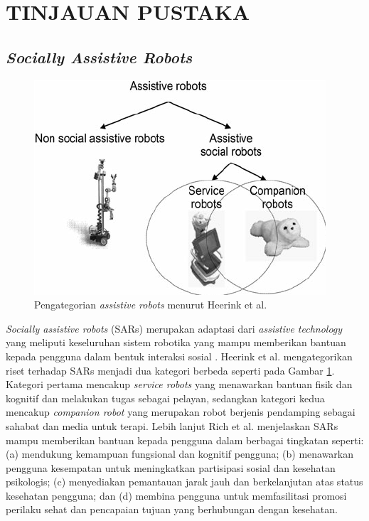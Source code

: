 \section{TINJAUAN PUSTAKA}

\subsection{\emph{Socially Assistive Robots}}

\begin{figure} [ht] \centering
	\includegraphics[scale=0.50]{gambar/robots-category.png}
	\caption{Pengategorian \emph{assistive robots} menurut Heerink et al. \citep{Heerink2010}}
	\label{fig:RobotsCategory}
\end{figure}

\emph{Socially assistive robots} (SARs) merupakan adaptasi dari \emph{assistive technology} yang meliputi keseluruhan sistem robotika yang mampu memberikan bantuan kepada pengguna dalam bentuk interaksi sosial \citep{Seifer2005}. Heerink et al. \citep{Heerink2010} mengategorikan riset terhadap SARs menjadi dua kategori berbeda seperti pada Gambar \ref{fig:RobotsCategory}.
Kategori pertama mencakup \emph{service robots} yang menawarkan bantuan fisik dan kognitif dan melakukan tugas sebagai pelayan, sedangkan kategori kedua mencakup \emph{companion robot} yang merupakan robot berjenis pendamping sebagai sahabat dan media untuk terapi.
Lebih lanjut Rich et al. \citep{Rich2009} menjelaskan SARs mampu memberikan bantuan kepada pengguna dalam berbagai tingkatan seperti:
(a) mendukung kemampuan fungsional dan kognitif pengguna;
(b) menawarkan pengguna kesempatan untuk meningkatkan partisipasi sosial dan kesehatan psikologis;
(c) menyediakan pemantauan jarak jauh dan berkelanjutan atas status kesehatan pengguna;
dan (d) membina pengguna untuk memfasilitasi promosi perilaku sehat dan pencapaian tujuan yang berhubungan dengan kesehatan.

